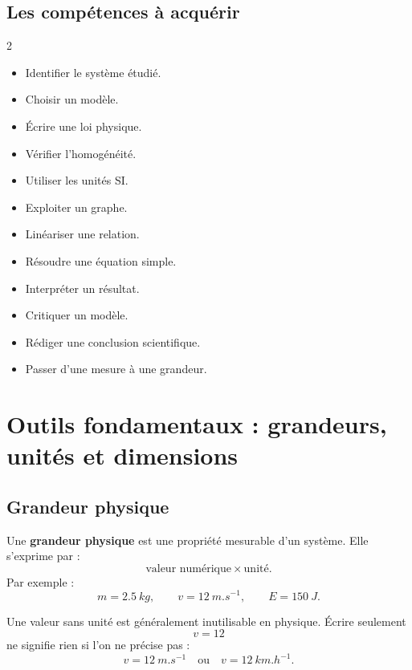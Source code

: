 \documentclass[11pt,a4paper]{article}
\begin{document}
\subsection{Les compétences à acquérir}

\begin{multicols}{2}
\begin{itemize}
  \item Identifier le système étudié.
  \item Choisir un modèle.
  \item Écrire une loi physique.
  \item Vérifier l'homogénéité.
  \item Utiliser les unités SI.
  \item Exploiter un graphe.
  \item Linéariser une relation.
  \item Résoudre une équation simple.
  \item Interpréter un résultat.
  \item Critiquer un modèle.
  \item Rédiger une conclusion scientifique.
  \item Passer d'une mesure à une grandeur.
\end{itemize}
\end{multicols}

\section{Outils fondamentaux : grandeurs, unités et dimensions}

\subsection{Grandeur physique}

\begin{definition}
Une \textbf{grandeur physique} est une propriété mesurable d'un système. Elle s'exprime par :
\[
\text{valeur numérique} \times \text{unité}.
\]
Par exemple :
\[
m=\SI{2.5}{kg}, \qquad v=\SI{12}{m.s^{-1}}, \qquad E=\SI{150}{J}.
\]
\end{definition}

\begin{alerte}
Une valeur sans unité est généralement inutilisable en physique.  
Écrire seulement
\[
v=12
\]
ne signifie rien si l'on ne précise pas :
\[
v=\SI{12}{m.s^{-1}}
\quad \text{ou} \quad
v=\SI{12}{km.h^{-1}}.
\]
\end{alerte}
\end{document}
